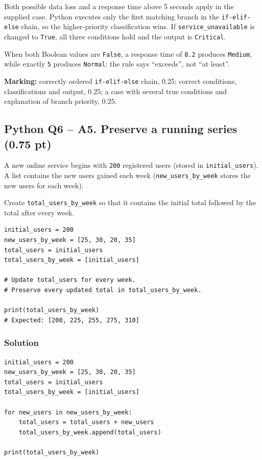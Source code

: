 \documentclass[10pt]{article}
\begin{document}
Both possible data loss and a response time above 5 seconds apply in the
supplied case. Python executes only the first matching branch in the
\texttt{if-elif-else} chain, so the higher-priority classification wins.
If \texttt{service\_unavailable} is changed to \texttt{True}, all three
conditions hold and the output is \texttt{Critical}.

When both Boolean values are \texttt{False}, a response time of
\texttt{8.2} produces \texttt{Medium}, while exactly \texttt{5} produces
\texttt{Normal}: the rule says ``exceeds'', not ``at least''.

\textbf{Marking:} correctly ordered \texttt{if-elif-else} chain, 0.25;
correct conditions, classifications and output, 0.25; a case with several
true conditions and explanation of branch priority, 0.25.

\clearpage
\subsection*{Python Q6 -- A5. Preserve a running series (0.75 pt)}
A new online service begins with \texttt{200} registered users (stored in
\texttt{initial\_users}). A list contains the new users gained each week
(\texttt{new\_users\_by\_week} stores the new users for each week).

Create \texttt{total\_users\_by\_week} so that it contains the initial
total followed by the total after every week.

\begin{verbatim}
initial_users = 200
new_users_by_week = [25, 30, 20, 35]
total_users = initial_users
total_users_by_week = [initial_users]

# Update total_users for every week.
# Preserve every updated total in total_users_by_week.

print(total_users_by_week)
# Expected: [200, 225, 255, 275, 310]
\end{verbatim}

\subsubsection*{Solution}
\begin{verbatim}
initial_users = 200
new_users_by_week = [25, 30, 20, 35]
total_users = initial_users
total_users_by_week = [initial_users]

for new_users in new_users_by_week:
    total_users = total_users + new_users
    total_users_by_week.append(total_users)

print(total_users_by_week)
\end{verbatim}
\end{document}
